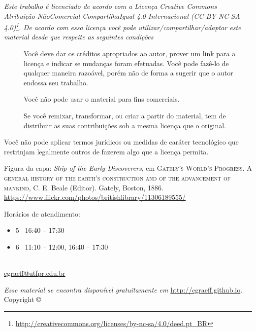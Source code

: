 \thispagestyle{empty}
\begin{center}
\Huge\ccbyncsa
\end{center}
{\it
Este trabalho é licenciado de acordo com a Licença Creative Commons  Atribuição-NãoComercial-CompartilhaIgual 4.0 Internacional  (CC BY-NC-SA 4.0)\footnote{\url{http://creativecommons.org/licenses/by-nc-sa/4.0/deed.pt_BR}}. De acordo com essa licença você pode utilizar/compartilhar/adaptar este material desde que respeite as seguintes condições
\begin{description}
	\item[\ccAttribution]Você deve dar os créditos apropriados ao autor, prover um link para a licença e indicar se mudanças foram efetuadas. Você pode fazê-lo de qualquer maneira razoável, porém não de forma a sugerir que o autor endossa seu trabalho.

    \item[\ccNonCommercial]Você não pode usar o material para fins comerciais.

    \item[\ccShareAlike]Se você remixar, transformar, ou criar a partir do material, tem de distribuir as suas contribuições sob a mesma licença que o original.
\end{description}
Você não pode aplicar termos jurídicos ou medidas de caráter tecnológico que restrinjam legalmente outros de fazerem algo que a licença permita.
}

%
\vfill
%
\begin{fullwidth}
Figura da capa: \textit{Ship of the Early Discoverers}, em \textsc{Gately's World's Progress. A general history of the earth's construction and of the advancement of mankind}, C. E. Beale (Editor). Gately, Boston, 1886. \url{https://www.flickr.com/photos/britishlibrary/11306189555/}
\end{fullwidth}
%
\vfill
%
\begin{fullwidth}
Horários de atendimento:
\begin{itemize}
    \item 5\textordfeminine~ 16:40 -- 17:30
	\item 6\textordfeminine~ 11:10 -- 12:00, 16:40 -- 17:30
\end{itemize}
\end{fullwidth}
%
\begin{fullwidth}
\setlength{\parindent}{0pt}
\setlength{\parskip}{\baselineskip}
\thanklessauthor\\
\url{cgraeff@utfpr.edu.br}\\
\textit{\monthyear}
\end{fullwidth}
%
\vspace{1cm}
%
\begin{fullwidth}
\par\emph{Esse material se encontra disponível gratuitamente em} \url{http://cgraeff.github.io}.\\
\noindent{}Copyright \copyright\ \the\year\ \thanklessauthor
\end{fullwidth}
